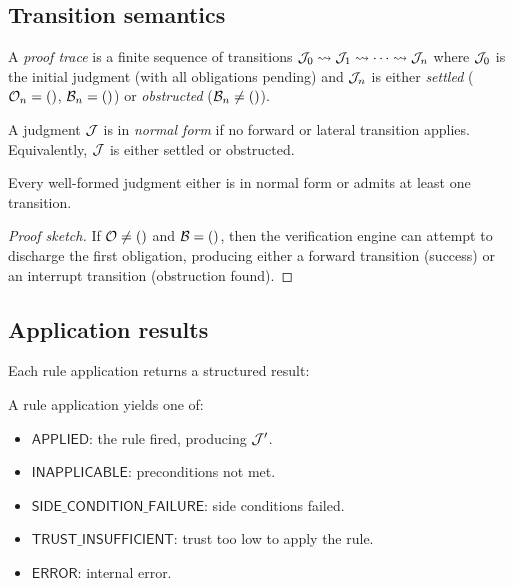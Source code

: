 \documentclass[11pt]{article}
\begin{document}
\subsection{Transition semantics}

A \emph{proof trace} is a finite sequence of transitions
$\mathcal{J}_0 \leadsto \mathcal{J}_1 \leadsto \cdots \leadsto \mathcal{J}_n$ where $\mathcal{J}_0$ is the
initial judgment (with all obligations pending) and $\mathcal{J}_n$ is either
\emph{settled} ($\mathcal{O}_n = ()$, $\mathcal{B}_n = ()$) or
\emph{obstructed} ($\mathcal{B}_n \neq ()$).

\begin{definition}
A judgment $\mathcal{J}$ is in \emph{normal form} if no forward or lateral
transition applies.  Equivalently, $\mathcal{J}$ is either settled or obstructed.
\end{definition}

\begin{proposition}[Progress]\label{prop:progress}
Every well-formed judgment either is in normal form or admits at least
one transition.
\end{proposition}

\begin{proof}[Proof sketch]
If $\mathcal{O} \neq ()$ and $\mathcal{B} = ()$, then the verification engine can
attempt to discharge the first obligation, producing either a forward
transition (success) or an interrupt transition (obstruction found).
\end{proof}

\subsection{Application results}

Each rule application returns a structured result:

\begin{definition}
A rule application yields one of:
\begin{itemize}
  \item $\mathsf{APPLIED}$: the rule fired, producing $\mathcal{J}'$.
  \item $\mathsf{INAPPLICABLE}$: preconditions not met.
  \item $\mathsf{SIDE\_CONDITION\_FAILURE}$: side conditions failed.
  \item $\mathsf{TRUST\_INSUFFICIENT}$: trust too low to apply the rule.
  \item $\mathsf{ERROR}$: internal error.
\end{itemize}
\end{definition}
\end{document}
